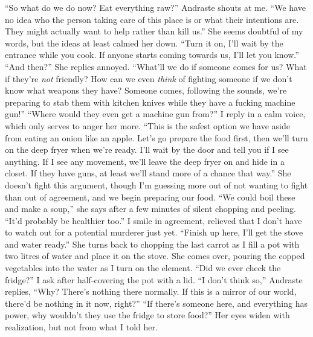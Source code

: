 \documentclass[a4paper, 12pt]{book}
\newcommand\tab[1][1cm]{\hspace*{#1}}
\begin{document}
\newline
\tab
“So what do we do now? Eat everything raw?” Andraste shouts at me.
\newline
\tab
“We have no idea who the person taking care of this place is or what their intentions are. They might actually want to help rather than kill us.” She seems doubtful of my words, but the ideas at least calmed her down. “Turn it on, I’ll wait by the entrance while you cook. If anyone starts coming towards us, I’ll let you know.”
\newline
\tab
“And then?” She replies annoyed. “What’ll we do if someone comes for us? What if they’re \textit{not} friendly? How can we even \textit{think} of fighting someone if we don’t know what weapons they have? Someone comes, following the sounds, we’re preparing to stab them with kitchen knives while they have a fucking machine gun!”
\newline
\tab
“Where would they even get a machine gun from?” I reply in a calm voice, which only serves to anger her more. “This is the safest option we have aside from eating an onion like an apple. Let’s go prepare the food first, then we’ll turn on the deep fryer when we’re ready. I’ll wait by the door and tell you if I see anything. If I see any movement, we’ll leave the deep fryer on and hide in a closet. If they have guns, at least we’ll stand more of a chance that way.” She doesn’t fight this argument, though I’m guessing more out of not wanting to fight than out of agreement, and we begin preparing our food.
\newline
\tab
“We could boil these and make a soup,” she says after a few minutes of silent chopping and peeling. “It’d probably be healthier too.”
\newline
\tab
I smile in agreement, relieved that I don’t have to watch out for a potential murderer just yet. “Finish up here, I’ll get the stove and water ready.” She turns back to chopping the last carrot as I fill a pot with two litres of water and place it on the stove. She comes over, pouring the copped vegetables into the water as I turn on the element. “Did we ever check the fridge?” I ask after half-covering the pot with a lid.
\newline
\tab
“I don’t think so,” Andraste replies, “Why? There’s nothing there normally. If this is a mirror of our world, there’d be nothing in it now, right?”
\newline
\tab
“If there’s someone here, and everything has power, why wouldn’t they use the fridge to store food?” Her eyes widen with realization, but not from what I told her.
\end{document}
